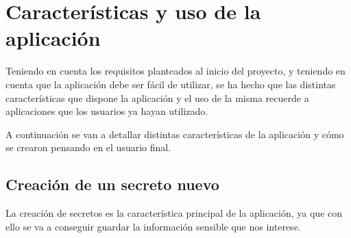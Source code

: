 \documentclass{\ClassPath/viu-tfm-template}
\begin{document}
\section{Características y uso de la aplicación}

Teniendo en cuenta los requisitos planteados al inicio del proyecto, y teniendo en cuenta que la aplicación debe ser fácil de utilizar, se ha hecho que las distintas características que dispone la aplicación y el uso de la misma recuerde a aplicaciones que los usuarios ya hayan utilizado.

A continuación se van a detallar distintas características de la aplicación y cómo se crearon pensando en el usuario final.


\subsection{Creación de un secreto nuevo}

La creación de secretos es la característica principal de la aplicación, ya que con ello se va a conseguir guardar la información sensible que nos interese.
\end{document}
